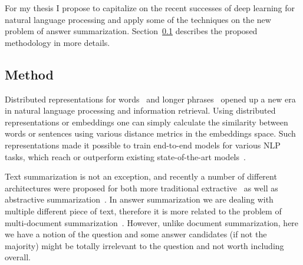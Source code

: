 For my thesis I propose to capitalize on the recent successes of deep learning for natural language processing and apply some of the techniques on the new problem of answer summarization.
Section~\ref{section:non-factoid:proposal:method} describes the proposed methodology in more details.

\subsection{Method}
\label{section:non-factoid:proposal:method}

Distributed representations for words~\cite{mikolov2013distributed,pennington2014glove} and longer phrases~\cite{le2014distributed,kiros2015skip} opened up a new era in natural language processing and information retrieval.
Using distributed representations or embeddings one can simply calculate the similarity between words or sentences using various distance metrics in the embeddings space.
Such representations made it possible to train end-to-end models for various NLP tasks, which reach or outperform existing state-of-the-art models~\cite{collobert2011natural}.

Text summarization is not an exception, and recently a number of different architectures were proposed for both more traditional extractive~\cite{kaageback2014extractive} as well as abstractive summarization~\cite{rush-chopra-weston:2015:EMNLP,chopraabstractive16}.
In answer summarization we are dealing with multiple different piece of text, therefore it is more related to the problem of multi-document summarization~\cite{cao2015ranking}.
However, unlike document summarization, here we have a notion of the question and some answer candidates (if not the majority) might be totally irrelevant to the question and not worth including overall.

